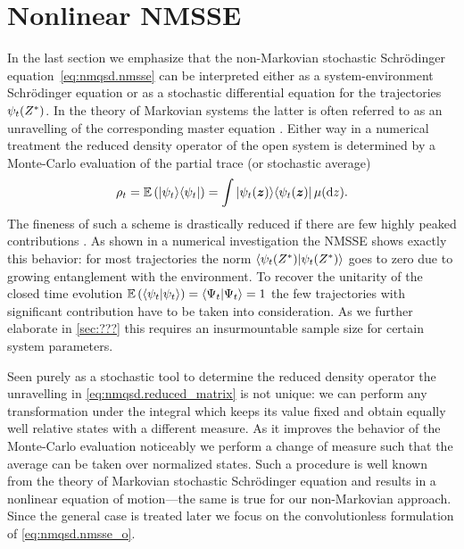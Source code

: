 \section{Nonlinear NMSSE}
\label{sec:nmqsd.nonlin_nmsse}
%

In the last section we emphasize that the non-Markovian stochastic Schrödinger equation~\ref{eq:nmqsd.nmsse} can be interpreted either as a system-environment Schrödinger equation or as a stochastic differential equation for the trajectories $\psi_t({Z}^*)$.
In the theory of Markovian systems the latter is often referred to as an unravelling of the corresponding master equation \cite{???}.
Either way in a numerical treatment the reduced density operator of the open system is determined by a Monte-Carlo evaluation of the partial trace (or stochastic average)
\begin{equation}
  \rho_t = \E[\ket{\psi_t}\bra{\psi_t}] = \int \ket{\psi_t(\zz)}\bra{\psi_t(\zz)} \mudz.
  \label{eq:nmqsd.reduced_matrix}
\end{equation}
The fineness of such a scheme is drastically reduced if there are few highly peaked contributions \cite{DuSh11_monte_carlo}.
As shown in a numerical investigation \cite{???} the NMSSE shows exactly this behavior: for most trajectories the norm $\langle \psi_t({Z}^*) | \psi_t({Z}^*) \rangle$ goes to zero due to growing entanglement with the environment.
To recover the unitarity of the closed time evolution $\E[\braket{\psi_t}{\psi_t}] = \braket{\Psi_t}{\Psi_t} = 1$ the few trajectories with significant contribution have to be taken into consideration.
As we further elaborate in \autoref{sec:???} this requires an insurmountable sample size for certain system parameters.

Seen purely as a stochastic tool to determine the reduced density operator the unravelling in \autoref{eq:nmqsd.reduced_matrix} is not unique:
we can perform any transformation under the integral which keeps its value fixed and obtain equally well relative states with a different measure.
As it improves the behavior of the Monte-Carlo evaluation noticeably we perform a change of measure such that the average can be taken over normalized states.
Such a procedure is well known from the theory of Markovian stochastic Schrödinger equation \cite{???} and results in a nonlinear equation of motion---the same is true for our non-Markovian approach.
Since the general case is treated later we focus on the convolutionless formulation of \autoref{eq:nmqsd.nmsse_o}.


